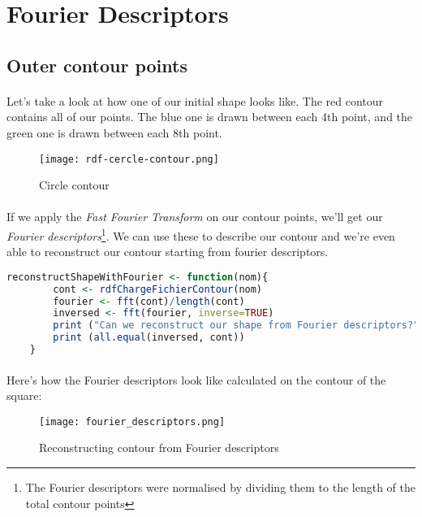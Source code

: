 \clearpage

\section{Fourier Descriptors}
\subsection{Outer contour points}
\paragraph{}
Let's take a look at how one of our initial shape looks like. The red contour contains all of our points.
The blue one is drawn between each 4th point, and the green one is drawn between each 8th point.
\begin{figure}[ht]
    \centering
    \texttt{[image: rdf-cercle-contour.png]}
    \caption{Circle contour}
\end{figure}

\paragraph{}
If we apply the \emph{Fast Fourier Transform} on our contour points, we'll get our \emph{Fourier descriptors}\footnote{The Fourier descriptors were normalised by dividing them to the length of the total contour points}.
We can use these to describe our contour and we're even able to reconstruct our contour starting from fourier descriptors.

\begin{lstlisting}[language=R, caption=Calculating Fourier descriptors]
    reconstructShapeWithFourier <- function(nom){
        cont <- rdfChargeFichierContour(nom)
        fourier <- fft(cont)/length(cont)
        inversed <- fft(fourier, inverse=TRUE)
        print ("Can we reconstruct our shape from Fourier descriptors?")
        print (all.equal(inversed, cont))
    }
\end{lstlisting}

\paragraph{}
Here's how the Fourier descriptors look like calculated on the contour of the square:
\begin{figure}[ht]
    \centering
    \texttt{[image: fourier\_descriptors.png]}
    \caption{Reconstructing contour from Fourier descriptors}
\end{figure}

